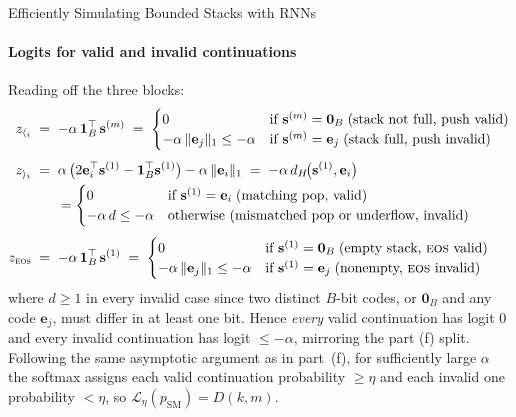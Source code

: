 \begin{question}{Efficiently Simulating Bounded Stacks with RNNs}
\begin{subquestion}
    \paragraph{Logits for valid and invalid continuations} Reading off the three blocks:
    \begin{align*}
        z_{\openBr{i}} \;&=\; -\alpha\,\mathbf{1}_B^\top\,\mathbf{s}^{(m)} \;=\;
            \begin{cases} 0 & \text{if } \mathbf{s}^{(m)} = \mathbf{0}_B \;(\text{stack not full, push valid}) \\ -\alpha\,\|\mathbf{e}_j\|_1 \le -\alpha & \text{if } \mathbf{s}^{(m)} = \mathbf{e}_j \;(\text{stack full, push invalid}) \end{cases} \\[4pt]
        z_{\closeBr{i}} \;&=\; \alpha\,\bigl(2\mathbf{e}_i^\top \mathbf{s}^{(1)} - \mathbf{1}_B^\top \mathbf{s}^{(1)}\bigr) - \alpha\,\|\mathbf{e}_i\|_1 \;=\; -\alpha\, d_H\!\bigl(\mathbf{s}^{(1)}, \mathbf{e}_i\bigr) \\
            &\quad\;\;= \begin{cases} 0 & \text{if } \mathbf{s}^{(1)} = \mathbf{e}_i \;(\text{matching pop, valid}) \\ -\alpha\, d \le -\alpha & \text{otherwise (mismatched pop or underflow, invalid)} \end{cases} \\[4pt]
        z_{\eos} \;&=\; -\alpha\,\mathbf{1}_B^\top\,\mathbf{s}^{(1)} \;=\;
            \begin{cases} 0 & \text{if } \mathbf{s}^{(1)} = \mathbf{0}_B \;(\text{empty stack, } \eos \text{ valid}) \\ -\alpha\,\|\mathbf{e}_j\|_1 \le -\alpha & \text{if } \mathbf{s}^{(1)} = \mathbf{e}_j \;(\text{nonempty, } \eos \text{ invalid}) \end{cases}
    \end{align*}
    where $d \ge 1$ in every invalid case since two distinct $B$-bit codes, or $\mathbf{0}_B$ and any code $\mathbf{e}_j$, must differ in at least one bit. 
    Hence \emph{every} valid continuation has logit $0$ and every invalid continuation has logit $\le -\alpha$, mirroring the part (f) split. 
    Following the same asymptotic argument as in part~(f), for sufficiently large $\alpha$ the softmax assigns each valid continuation probability $\ge \eta$ and each invalid one probability $<\eta$, so $\mathcal{L}_{\eta}(p_{\text{SM}}) = D(k, m)$.
\end{subquestion}

\end{question}